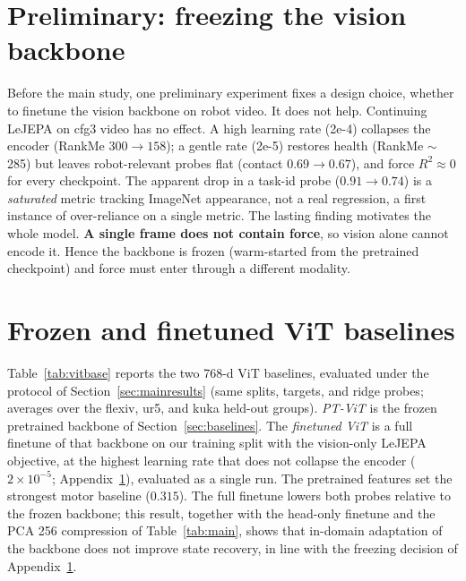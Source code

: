 \documentclass{article}
\begin{document}
\section{Preliminary: freezing the vision backbone}
\label{sec:stage1}
Before the main study, one preliminary experiment fixes a design choice, whether to finetune the vision backbone on robot video. It does not help. Continuing LeJEPA on cfg3 video has no effect. A high learning rate (2e-4) collapses the encoder (RankMe $300\!\rightarrow\!158$); a gentle rate (2e-5) restores health (RankMe $\sim$285) but leaves robot-relevant probes flat (contact $0.69\!\rightarrow\!0.67$), and force $R^2\approx0$ for every checkpoint. The apparent drop in a task-id probe ($0.91\!\rightarrow\!0.74$) is a \emph{saturated} metric tracking ImageNet appearance, not a real regression, a first instance of over-reliance on a single metric. The lasting finding motivates the whole model. \textbf{A single frame does not contain force}, so vision alone cannot encode it. Hence the backbone is frozen (warm-started from the pretrained checkpoint) and force must enter through a different modality.

\clearpage

\section{Frozen and finetuned ViT baselines}
\label{sec:vitbase}
Table~\ref{tab:vitbase} reports the two 768-d ViT baselines, evaluated under the protocol of Section~\ref{sec:mainresults} (same splits, targets, and ridge probes; averages over the flexiv, ur5, and kuka held-out groups). \emph{PT-ViT} is the frozen pretrained backbone of Section~\ref{sec:baselines}. The \emph{finetuned ViT} is a full finetune of that backbone on our training split with the vision-only LeJEPA objective, at the highest learning rate that does not collapse the encoder ($2\times10^{-5}$; Appendix~\ref{sec:stage1}), evaluated as a single run. The pretrained features set the strongest motor baseline ($0.315$). The full finetune lowers both probes relative to the frozen backbone; this result, together with the head-only finetune and the PCA 256 compression of Table~\ref{tab:main}, shows that in-domain adaptation of the backbone does not improve state recovery, in line with the freezing decision of Appendix~\ref{sec:stage1}.
\end{document}
